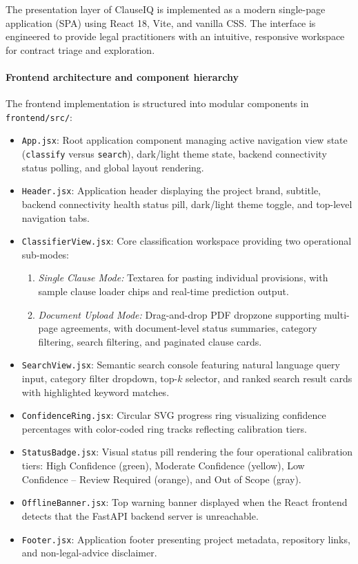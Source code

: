 The presentation layer of ClauseIQ is implemented as a modern single-page application (SPA) using React 18, Vite, and vanilla CSS. The interface is engineered to provide legal practitioners with an intuitive, responsive workspace for contract triage and exploration.

\paragraph*{Frontend architecture and component hierarchy}
The frontend implementation is structured into modular components in \texttt{frontend/src/}:
\begin{itemize}
    \item \texttt{App.jsx}: Root application component managing active navigation view state (\texttt{classify} versus \texttt{search}), dark/light theme state, backend connectivity status polling, and global layout rendering.
    \item \texttt{Header.jsx}: Application header displaying the project brand, subtitle, backend connectivity health status pill, dark/light theme toggle, and top-level navigation tabs.
    \item \texttt{ClassifierView.jsx}: Core classification workspace providing two operational sub-modes:
    \begin{enumerate}
        \item \textit{Single Clause Mode:} Textarea for pasting individual provisions, with sample clause loader chips and real-time prediction output.
        \item \textit{Document Upload Mode:} Drag-and-drop PDF dropzone supporting multi-page agreements, with document-level status summaries, category filtering, search filtering, and paginated clause cards.
    \end{enumerate}
    \item \texttt{SearchView.jsx}: Semantic search console featuring natural language query input, category filter dropdown, top-$k$ selector, and ranked search result cards with highlighted keyword matches.
    \item \texttt{ConfidenceRing.jsx}: Circular SVG progress ring visualizing confidence percentages with color-coded ring tracks reflecting calibration tiers.
    \item \texttt{StatusBadge.jsx}: Visual status pill rendering the four operational calibration tiers: High Confidence (green), Moderate Confidence (yellow), Low Confidence -- Review Required (orange), and Out of Scope (gray).
    \item \texttt{OfflineBanner.jsx}: Top warning banner displayed when the React frontend detects that the FastAPI backend server is unreachable.
    \item \texttt{Footer.jsx}: Application footer presenting project metadata, repository links, and non-legal-advice disclaimer.
\end{itemize}

